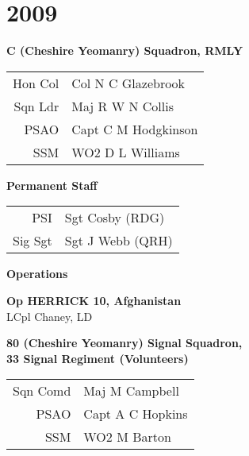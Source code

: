 \chapter*{2009}

\vspace*{10mm}

\begin{center}
  \Large
  \textbf{C (Cheshire Yeomanry) Squadron, RMLY}
\end{center}

\begin{center}
  \begin{tabular}{rl}
    Hon Col & Col N C Glazebrook \\
    Sqn Ldr & Maj R W N Collis \\
    PSAO & Capt C M Hodgkinson \\
    SSM & WO2 D L Williams \\
  \end{tabular}
\end{center}

\begin{center}
  \Large
  \textbf{Permanent Staff}
\end{center}

\begin{center}
  \begin{tabular}{rl}
    PSI & Sgt Cosby (RDG) \\
    Sig Sgt & Sgt J Webb (QRH) \\
  \end{tabular}
\end{center}

\begin{center}
  \Large
  \textbf{Operations}
\end{center}

\begin{center}
  \noindent
  \textbf{Op HERRICK 10, Afghanistan} \\
  LCpl Chaney, LD \\
\end{center}

\vspace*{10mm}

\begin{center}
  \Large
  \textbf{80 (Cheshire Yeomanry) Signal Squadron, \\ 33 Signal Regiment (Volunteers)}
\end{center}

\begin{center}
  \begin{tabular}{rl}
    Sqn Comd & Maj M Campbell \\
    PSAO & Capt A C Hopkins \\
    SSM & WO2 M Barton \\
  \end{tabular}
\end{center}

